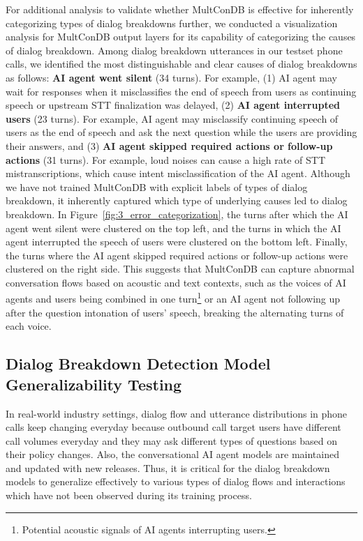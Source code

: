 For additional analysis to validate whether MultConDB is effective for inherently categorizing types of dialog breakdowns further, we conducted a visualization analysis for MultConDB output layers for its capability of categorizing the causes of dialog breakdown. Among dialog breakdown utterances in our testset phone calls, we identified the most distinguishable and clear causes of dialog breakdowns as follows: \textbf{AI agent went silent} (34 turns). For example, (1) AI agent may wait for responses when it misclassifies the end of speech from users as continuing speech or upstream STT finalization was delayed, (2) \textbf{AI agent interrupted users} (23 turns). For example, AI agent may misclassify continuing speech of users as the end of speech and ask the next question while the users are providing their answers, and (3) \textbf{AI agent skipped required actions or follow-up actions} (31 turns). For example, loud noises can cause a high rate of STT mistranscriptions, which cause intent misclassification of the  AI agent. 
Although we have not trained MultConDB with explicit labels of types of dialog breakdown, it inherently captured which type of underlying causes led to dialog breakdown. In Figure~\ref{fig:3_error_categorization}, the turns after which the AI agent went silent were clustered on the top left, and the turns in which the AI agent interrupted the speech of users were clustered on the bottom left. Finally, the turns where the AI agent skipped required actions or follow-up actions were clustered on the right side. This suggests that MultConDB can capture abnormal conversation flows based on acoustic and text contexts, such as the voices of AI agents and users being combined in one turn\footnote{Potential acoustic signals of AI agents interrupting users.} or an AI agent not following up after the question intonation of users' speech, breaking the alternating turns of each voice.

\subsection{Dialog Breakdown Detection Model Generalizability Testing} \label{sec:generalizability_main}

In real-world industry settings, dialog flow and utterance distributions in phone calls keep changing everyday because outbound call target users have different call volumes everyday and they may ask different types of questions based on their policy changes. Also, the conversational AI agent models are maintained and updated with new releases. Thus, it is critical for the dialog breakdown models to generalize effectively to various types of dialog flows and interactions which have not been observed during its training process. 

